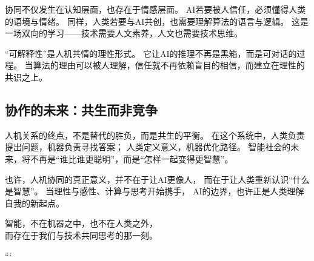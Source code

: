 协同不仅发生在认知层面，也存在于情感层面。
AI若要被人信任，必须懂得人类的语境与情绪。
同样，人类若要与AI共创，也需要理解算法的语言与逻辑。
这是一场双向的学习——技术需要人文素养，人文也需要技术思维。

“可解释性”是人机共情的理性形式。
它让AI的推理不再是黑箱，而是可对话的过程。
当算法的理由可以被人理解，信任就不再依赖盲目的相信，而建立在理性的共识之上。

\subsection{协作的未来：共生而非竞争}

人机关系的终点，不是替代的胜负，而是共生的平衡。
在这个系统中，人类负责提出问题，机器负责寻找答案；
人类定义意义，机器优化路径。
智能社会的未来，将不再是“谁比谁更聪明”，而是“怎样一起变得更智慧”。

也许，人机协同的真正意义，并不在于让AI更像人，
而在于让人类重新认识“什么是智慧”。
当理性与感性、计算与思考开始携手，
AI的边界，也许正是人类理解自我的新起点。

\begin{center}
智能，不在机器之中，也不在人类之外，\\
而存在于我们与技术共同思考的那一刻。
\end{center}
```

